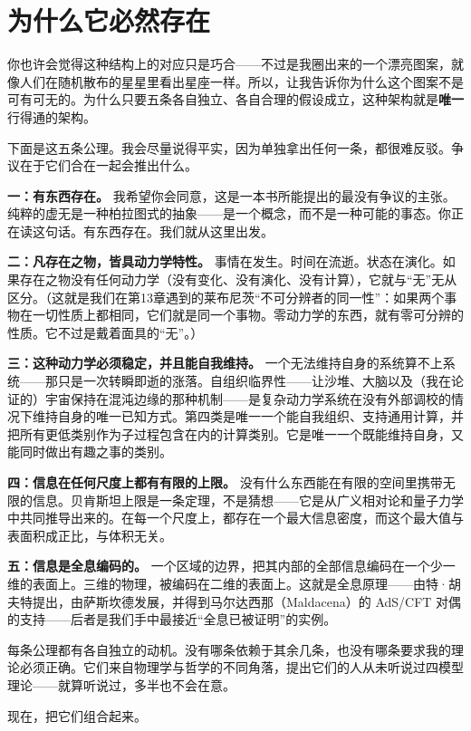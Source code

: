 \documentclass[11pt, twoside, openright]{book}
\begin{document}
\section*{为什么它必然存在}

你也许会觉得这种结构上的对应只是巧合------不过是我圈出来的一个漂亮图案，就像人们在随机散布的星星里看出星座一样。所以，让我告诉你为什么这个图案不是可有可无的。为什么只要五条各自独立、各自合理的假设成立，这种架构就是\textbf{唯一}行得通的架构。

下面是这五条公理。我会尽量说得平实，因为单独拿出任何一条，都很难反驳。争议在于它们合在一起会推出什么。

\textbf{一：有东西存在。} 我希望你会同意，这是一本书所能提出的最没有争议的主张。纯粹的虚无是一种柏拉图式的抽象------是一个概念，而不是一种可能的事态。你正在读这句话。有东西存在。我们就从这里出发。

\textbf{二：凡存在之物，皆具动力学特性。} 事情在发生。时间在流逝。状态在演化。如果存在之物没有任何动力学（没有变化、没有演化、没有计算），它就与“无”无从区分。（这就是我们在第13章遇到的莱布尼茨“不可分辨者的同一性”：如果两个事物在一切性质上都相同，它们就是同一个事物。零动力学的东西，就有零可分辨的性质。它不过是戴着面具的“无”。）

\textbf{三：这种动力学必须稳定，并且能自我维持。} 一个无法维持自身的系统算不上系统------那只是一次转瞬即逝的涨落。自组织临界性------让沙堆、大脑以及（我在论证的）宇宙保持在混沌边缘的那种机制------是复杂动力学系统在没有外部调校的情况下维持自身的唯一已知方式。第四类是唯一一个能自我组织、支持通用计算，并把所有更低类别作为子过程包含在内的计算类别。它是唯一一个既能维持自身，又能同时做出有趣之事的类别。

\textbf{四：信息在任何尺度上都有有限的上限。} 没有什么东西能在有限的空间里携带无限的信息。贝肯斯坦上限是一条定理，不是猜想------它是从广义相对论和量子力学中共同推导出来的。在每一个尺度上，都存在一个最大信息密度，而这个最大值与表面积成正比，与体积无关。

\textbf{五：信息是全息编码的。} 一个区域的边界，把其内部的全部信息编码在一个少一维的表面上。三维的物理，被编码在二维的表面上。这就是全息原理------由特·胡夫特提出，由萨斯坎德发展，并得到马尔达西那（Maldacena）的 AdS/CFT 对偶的支持------后者是我们手中最接近“全息已被证明”的实例。

每条公理都有各自独立的动机。没有哪条依赖于其余几条，也没有哪条要求我的理论必须正确。它们来自物理学与哲学的不同角落，提出它们的人从未听说过四模型理论------就算听说过，多半也不会在意。

现在，把它们组合起来。
\end{document}
